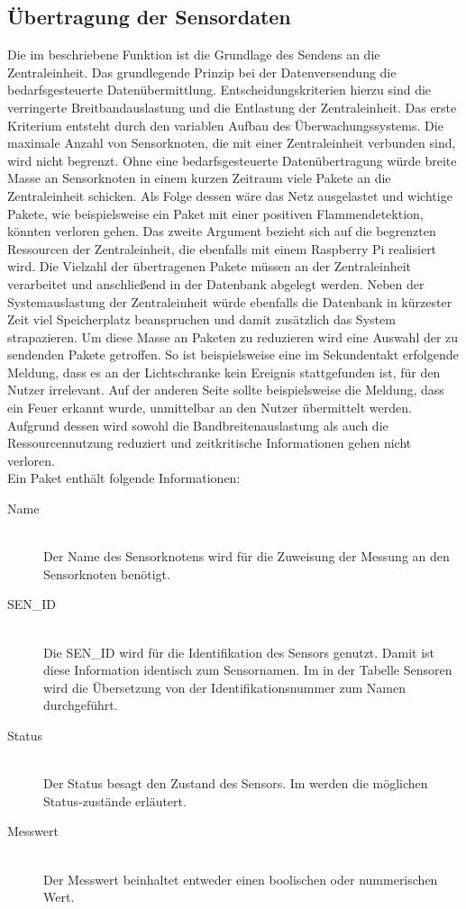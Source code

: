\subsection{Übertragung der Sensordaten}\label{Sensorknoten:JSON}
Die im  beschriebene Funktion ist die Grundlage des Sendens an die Zentraleinheit. Das grundlegende Prinzip bei der Datenversendung die bedarfsgesteuerte Datenübermittlung. Entscheidungskriterien hierzu sind die verringerte Breitbandauslastung und die Entlastung der Zentraleinheit. Das erste Kriterium entsteht durch den variablen Aufbau des Überwachungssystems. Die maximale Anzahl von Sensorknoten, die mit einer Zentraleinheit verbunden sind, wird nicht begrenzt. Ohne eine bedarfsgesteuerte Datenübertragung würde breite Masse an Sensorknoten in einem kurzen Zeitraum viele Pakete an die Zentraleinheit schicken. Als Folge dessen wäre das Netz ausgelastet und wichtige Pakete, wie beispielsweise ein Paket mit einer positiven Flammendetektion, könnten verloren gehen. Das zweite Argument bezieht sich auf die begrenzten Ressourcen der Zentraleinheit, die ebenfalls mit einem Raspberry Pi realisiert wird. Die Vielzahl der übertragenen Pakete müssen an der Zentraleinheit verarbeitet und anschließend in der Datenbank abgelegt werden. Neben der Systemauslastung der Zentraleinheit würde ebenfalls die Datenbank in kürzester Zeit viel Speicherplatz beanspruchen und damit zusätzlich das System strapazieren. Um diese Masse an Paketen zu reduzieren wird eine Auswahl der zu sendenden Pakete getroffen. So ist beispielsweise eine im Sekundentakt erfolgende Meldung, dass es an der Lichtschranke kein Ereignis stattgefunden ist, für den Nutzer irrelevant. Auf der anderen Seite sollte beispielsweise die Meldung, dass ein Feuer erkannt wurde, unmittelbar an den Nutzer übermittelt werden. Aufgrund dessen wird sowohl die Bandbreitenauslastung als auch die Ressourcennutzung reduziert und zeitkritische Informationen gehen nicht verloren.\\
Ein Paket enthält folgende Informationen:
\begin{description}
	\item[Name] \hfill \\
		Der Name des Sensorknotens wird für die Zuweisung der Messung an den Sensorknoten benötigt.
	\item[SEN\_ID] \hfill \\
		Die SEN\_ID wird für die Identifikation des Sensors genutzt. Damit ist diese Information identisch zum Sensornamen. Im  in der Tabelle Sensoren wird die Übersetzung von der Identifikationsnummer zum Namen durchgeführt.
	\item[Status] \hfill \\
		Der Status besagt den Zustand des Sensors. Im  werden die möglichen Status-zustände erläutert.
	\item[Messwert] \hfill \\
		Der Messwert beinhaltet entweder einen boolischen oder nummerischen Wert.
\end{description} 
